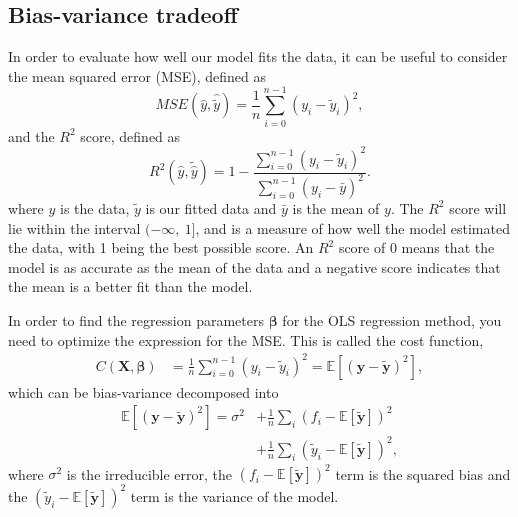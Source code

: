 \documentclass[a4paper, 10pt]{article}
\begin{document}
\begin{multicols}{2}
\subsection{Bias-variance tradeoff}
In order to evaluate how well our model fits the data, it can be useful to consider the mean squared error (MSE), defined as
\begin{equation}
    MSE(\hat{y},\hat{\tilde{y}}) = \frac{1}{n}
    \sum_{i=0}^{n-1}(y_i-\tilde{y}_i)^2,
    \label{eq:MSE}
\end{equation}
and the $R^2$ score, defined as
\begin{equation}
    R^2(\hat{y}, \tilde{\hat{y}}) = 1 - \frac{\sum_{i=0}^{n - 1} (y_i - \tilde{y}_i)^2}{\sum_{i=0}^{n - 1} (y_i - \bar{y})^2}.
    \label{eq:R2}
\end{equation}
where $y$ is the data, $\tilde{y}$ is our fitted data and $\bar{y}$ is the mean of $y$.  The $R^2$ score will lie within the interval $(-\infty,\ 1]$, and is a measure of how well the model estimated the data, with 1 being the best possible score. An $R^2$ score of 0 means that the model is as accurate as the mean of the data and a negative score indicates that the mean is a better fit than the model.

In order to find the regression parameters $\bm{\beta}$ for the OLS regression method, you need to  optimize the expression for the MSE. This is called the cost function,
\begin{align*}
C(\bm{X},\bm{\beta} ) &= \frac{1}{n}\sum_{i=0}^{n-1}(y_i-\tilde{y}_i)^2 = \mathbb{E}[	(\bm{y}-\bm{\tilde{y}})^2],
\end{align*}
which can be bias-variance decomposed into
\begin{align}
 \mathbb{E}[	(\bm{y}-\bm{\tilde{y}})^2]  =\sigma^2 &+ \frac{1}{n}\sum_i(f_i-\mathbb{E}\left[\bm{\tilde{y}}\right])^2  \nonumber \\
 &+ \frac{1}{n}\sum_i(\tilde{y}_i-\mathbb{E}\left[\bm{\tilde{y}}\right])^2,
 \label{eq:biasvariance}
\end{align}
where $\sigma^2$ is the irreducible error,  the $(f_i-\mathbb{E}\left[\bm{\tilde{y}}\right])^2$ term is the squared bias and the $(\tilde{y}_i-\mathbb{E}\left[\bm{\tilde{y}}\right])^2$ term is the variance of the model.


\end{multicols}
\end{document}
